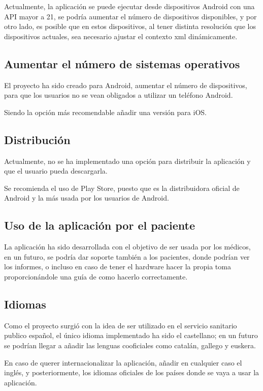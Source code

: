 Actualmente, la aplicación se puede ejecutar desde dispositivos Android con una API mayor a 21, se podría aumentar el número de dispositivos disponibles, y por otro lado, es posible que en estos dispositivos, al tener distinta resolución que los dispositivos actuales, sea necesario ajustar el contexto xml dinámicamente.

\subsection{Aumentar el número de sistemas operativos}

El proyecto ha sido creado para Android, aumentar el número de dispositivos, para que los usuarios no se vean obligados a utilizar un teléfono Android. 

Siendo la opción más recomendable añadir una versión para iOS.

\subsection{Distribución}

Actualmente, no se ha implementado una opción para distribuir la aplicación y que el usuario pueda descargarla.

Se recomienda el uso de Play Store, puesto que es la distribuidora oficial de Android y la más usada por los usuarios de Android.

\subsection{Uso de la aplicación por el paciente}

La aplicación ha sido desarrollada con el objetivo de ser usada por los médicos, en un futuro, se podría dar soporte también a los pacientes, donde podrían ver los informes, o incluso en caso de tener el hardware hacer la propia toma proporcionándole una guía de como hacerlo correctamente.

\subsection{Idiomas}

Como el proyecto surgió con la idea de ser utilizado en el servicio sanitario publico español, el único idioma implementado ha sido el castellano; en un futuro se podrían llegar a añadir las lenguas cooficiales como catalán, gallego y euskera.

En caso de querer internacionalizar la aplicación, añadir en cualquier caso el inglés, y posteriormente, los idiomas oficiales de los países donde se vaya a usar la aplicación.

